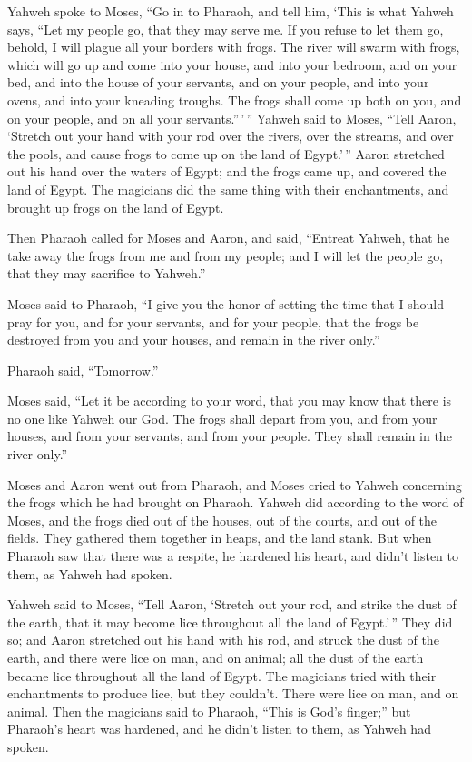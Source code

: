  Yahweh spoke to Moses, ``Go in to Pharaoh, and tell him,
`This is what Yahweh says, ``Let my people go, that they may serve me.
 If you refuse to let them go, behold, I will plague all
your borders with frogs.  The river will swarm with frogs,
which will go up and come into your house, and into your bedroom, and on
your bed, and into the house of your servants, and on your people, and
into your ovens, and into your kneading troughs.  The
frogs shall come up both on you, and on your people, and on all your
servants.''\,'\,''  Yahweh said to Moses, ``Tell Aaron,
`Stretch out your hand with your rod over the rivers, over the streams,
and over the pools, and cause frogs to come up on the land of
Egypt.'\,''  Aaron stretched out his hand over the waters
of Egypt; and the frogs came up, and covered the land of Egypt.
 The magicians did the same thing with their enchantments,
and brought up frogs on the land of Egypt.

 Then Pharaoh called for Moses and Aaron, and said,
``Entreat Yahweh, that he take away the frogs from me and from my
people; and I will let the people go, that they may sacrifice to
Yahweh.''

 Moses said to Pharaoh, ``I give you the honor of setting
the time that I should pray for you, and for your servants, and for your
people, that the frogs be destroyed from you and your houses, and remain
in the river only.''

 Pharaoh said, ``Tomorrow.''

Moses said, ``Let it be according to your word, that you may know that
there is no one like Yahweh our God.  The frogs shall
depart from you, and from your houses, and from your servants, and from
your people. They shall remain in the river only.''

 Moses and Aaron went out from Pharaoh, and Moses cried
to Yahweh concerning the frogs which he had brought on Pharaoh.
 Yahweh did according to the word of Moses, and the frogs
died out of the houses, out of the courts, and out of the fields.
 They gathered them together in heaps, and the land
stank.  But when Pharaoh saw that there was a respite, he
hardened his heart, and didn't listen to them, as Yahweh had spoken.

 Yahweh said to Moses, ``Tell Aaron, `Stretch out your
rod, and strike the dust of the earth, that it may become lice
throughout all the land of Egypt.'\,''  They did so; and
Aaron stretched out his hand with his rod, and struck the dust of the
earth, and there were lice on man, and on animal; all the dust of the
earth became lice throughout all the land of Egypt.  The
magicians tried with their enchantments to produce lice, but they
couldn't. There were lice on man, and on animal.  Then
the magicians said to Pharaoh, ``This is God's finger;'' but Pharaoh's
heart was hardened, and he didn't listen to them, as Yahweh had spoken.

